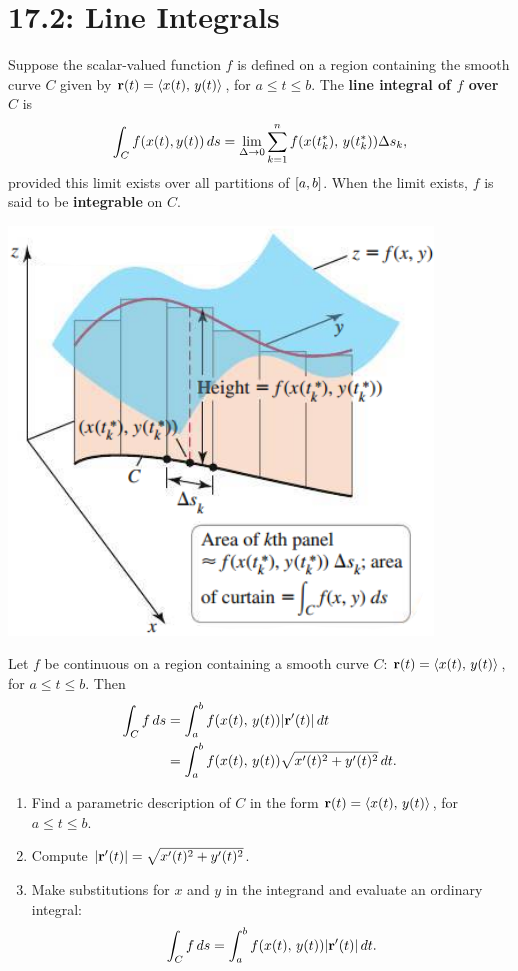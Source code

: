 \documentclass[../mathNotesPreamble]{subfiles}
\begin{document}
\section{17.2: Line Integrals}

  \begin{defn*}
    Suppose the scalar-valued function $f$ is defined on a region containing the smooth curve $C$ given by ${\mathbf{r}}(t)= {\left\langle x(t),\,y(t) \right\rangle}$, for $a\leq t\leq b$. The \textbf{line integral of $f$ over $C$} is
      \[\int_C f{\left(x(t), y(t)\right)}\,ds=\lim_{\Delta\to 0} \sum_{k=1}^n f{\left(x(t_k^*),\,y(t_k^*)\right)}\Delta s_k,\]
    provided this limit exists over all partitions of ${\left[a,b\right]}$. When the limit exists, $f$ is said to be \textbf{integrable} on $C$.
  \end{defn*}

  \begin{center}
    \includegraphics[width=0.325\linewidth]{../images/briggs_17_02/fig17_17}
  \end{center}

  \begin{thmBox*}
    Let $f$ be continuous on a region containing a smooth curve $C$: ${\mathbf{r}}(t)={\left\langle x(t),\,y(t) \right\rangle}$, for $a\leq t\leq b$. Then
    \begin{align*}
      \int_C f\,ds&= \int_a^b f{\left(x(t),\,y(t)\right)}{\left\vert{\mathbf{r}}'(t)\right\vert}\,dt\\
        &=\int_a^b f{\left(x(t),\,y(t)\right)}\sqrt{x'(t)^2+y'(t)^2}\,dt.
    \end{align*}
  \end{thmBox*}
  \pagebreak

  \begin{thmBox*}
    \begin{enumerate}
      \item 
        Find a parametric description of $C$ in the form ${\mathbf{r}}(t)={\left\langle x(t),\,y(t) \right\rangle}$, for $a\leq t\leq b$.
      \item 
        Compute ${\left\vert{\mathbf{r}}'(t)\right\vert}=\sqrt{x'(t)^2+y'(t)^2}$.
      \item 
        Make substitutions for $x$ and $y$ in the integrand and evaluate an ordinary integral:
          \[\int_C f\,ds = \int_a^b f{\left(x(t),\,y(t)\right)}{\left\vert{\mathbf{r}}'(t)\right\vert}\,dt.\]
    \end{enumerate}
  \end{thmBox*}
\end{document}
